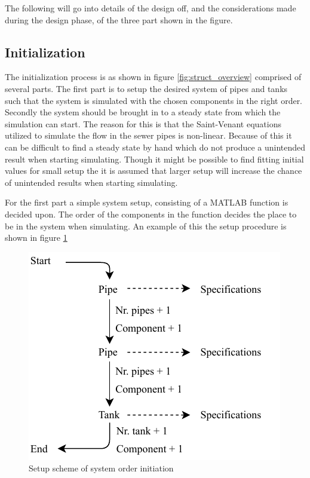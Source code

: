 The following will go into details of the design off, and the considerations made during the design phase, of the three part shown in the figure.

\subsection*{Initialization} 
The initialization process is as shown in figure \ref{fig:struct_overview} comprised of several parts. The first part is to setup the desired system of pipes and tanks such that the system is simulated with the chosen components in the right order.
Secondly the system should be brought in to a steady state from which the simulation can start.
The reason for this is that the Saint-Venant equations utilized to simulate the flow in the sewer pipes is non-linear. Because of this it can be difficult to find a steady state by hand which do not produce a unintended result when starting simulating. Though it might be possible to find fitting initial values for small setup the it is assumed that larger setup will increase the chance of unintended results when starting simulating.

For the first part a simple system setup, consisting of a MATLAB function is decided upon. The order of the components in the function decides the place to be in the system when simulating. An example of this the setup procedure is shown in figure \ref{fig:sys_setup}  

\begin{figure}[H]
\centering
\includegraphics[width=0.55 \textwidth]{report/simulation/pictures/sys_setup.pdf}
\caption{Setup scheme of system order initiation}
\label{fig:sys_setup}
\end{figure}

